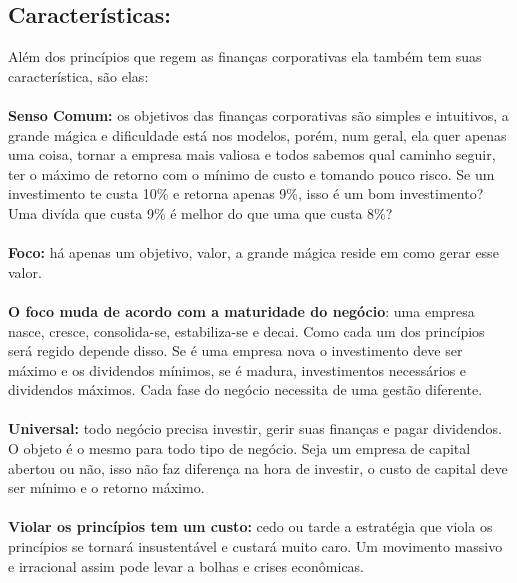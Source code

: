 \subsection*{Características:}
Além dos princípios que regem as finanças corporativas ela também tem suas característica, são elas:
\\~\\
\textbf{Senso Comum:} os objetivos das finanças corporativas são simples e intuitivos, a grande mágica e dificuldade está nos modelos, porém, num geral, ela quer apenas uma coisa, tornar a empresa mais valiosa e todos sabemos qual caminho seguir, ter o máximo de retorno com o mínimo de custo e tomando pouco risco. Se um investimento te custa 10\% e retorna apenas 9\%, isso é um bom investimento? Uma divída que custa 9\% é melhor do que uma que custa 8\%? 
\\~\\
\textbf{Foco:} há apenas um objetivo, valor, a grande mágica reside em como gerar esse valor.
\\~\\
\textbf{O foco muda de acordo com a maturidade do negócio}: uma empresa nasce, cresce, consolida-se, estabiliza-se e decai. Como cada um dos princípios será regido depende disso. Se é uma empresa nova o investimento deve ser máximo e os dividendos mínimos, se é madura, investimentos necessários e dividendos máximos. Cada fase do negócio necessita de uma gestão diferente.
\\~\\
\textbf{Universal:} todo negócio precisa investir, gerir suas finanças e pagar dividendos. O objeto é o mesmo para todo tipo de negócio. Seja um empresa de capital abertou ou não, isso não faz diferença na hora de investir, o custo de capital deve ser mínimo e o retorno máximo.
\\~\\
\textbf{Violar os princípios tem um custo:} cedo ou tarde a estratégia que viola os princípios se tornará insustentável e custará muito caro. Um movimento massivo e irracional assim pode levar a bolhas e crises econômicas.




























